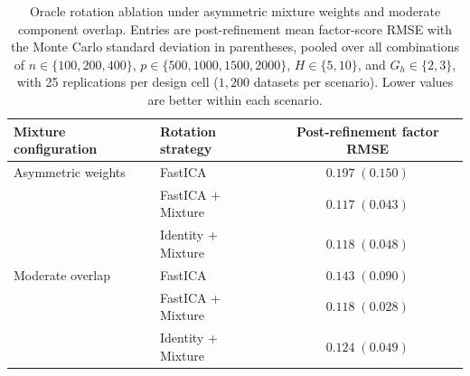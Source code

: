 \begin{table}[t]
\centering
\caption{Oracle rotation ablation under asymmetric mixture weights and moderate component overlap. Entries are post-refinement mean factor-score RMSE with the Monte Carlo standard deviation in parentheses, pooled over all combinations of $n\in\{100,200,400\}$, $p\in\{500,1000,1500,2000\}$, $H\in\{5,10\}$, and $G_h\in\{2,3\}$, with 25 replications per design cell ($1{,}200$ datasets per scenario). Lower values are better within each scenario.}
\label{tab:rotation_ablation_supplement}
\begin{tabular}{llc}
\toprule
Mixture configuration & Rotation strategy & Post-refinement factor RMSE \\
\midrule
Asymmetric weights
  & FastICA            & $0.197\;(0.150)$ \\
  & FastICA + Mixture  & $\mathbf{0.117}\;(\mathbf{0.043})$ \\
  & Identity + Mixture & $0.118\;(0.048)$ \\
\addlinespace
Moderate overlap
  & FastICA            & $0.143\;(0.090)$ \\
  & FastICA + Mixture  & $\mathbf{0.118}\;(\mathbf{0.028})$ \\
  & Identity + Mixture & $0.124\;(0.049)$ \\
\bottomrule
\end{tabular}
\end{table}

